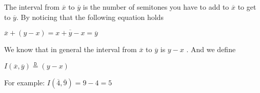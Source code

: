 \documentclass[preview]{standalone}
\begin{document}
\begin{center}
The interval from  $ \overline{x}$ to $ \overline{y }$ is the number of semitones you have to add to $ \overline{x}$ to get to $ \overline{y}$. By noticing that the following equation holds

	$\overline{x}  +  \left( y  -  x \right) = \overline{x  +  y  -  x} = \overline{y}$

  We know that in general the interval from $ \overline{x}$  to $ \overline{y}$ is $y  - x$ . And we define 

	$I\left( \overline{x}, \overline{y}\right) \stackrel{\mathtt{D}}{=} (y  -  x)$

  For example: $I\left( \overline{4}, \overline{9}\right) = 9  -  4 = 5$
\end{center}
\end{document}
